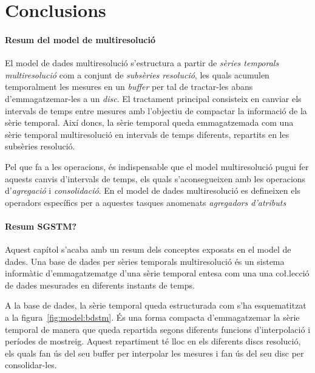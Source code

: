 \chapter{Conclusions}





\subsubsection{Resum del model de multiresolució}
El model de dades multiresolució s'estructura a partir de \emph{sèries temporals multiresolució} com a conjunt de \emph{subsèries resolució}, les quals  acumulen temporalment les mesures en un \emph{buffer} per tal de tractar-les abans d'emmagatzemar-les  a un \emph{disc}. El tractament principal consisteix en canviar els intervals de temps entre mesures amb l'objectiu de compactar la informació de la sèrie temporal.
Així doncs, la sèrie temporal queda emmagatzemada com una sèrie temporal multiresolució en intervals de temps diferents, repartits en les subsèries resolució. 

Pel que fa a les operacions, és indispensable que el model multiresolució pugui fer aquests canvis d'intervals de temps, els quals s'aconsegueixen amb les operacions d'\emph{agregació} i \emph{consolidació}. En el model de dades multiresolució es defineixen els operadors específics per a aquestes tasques anomenats \emph{agregadors d'atributs}



\subsubsection{Resum SGSTM?}

Aquest capítol s'acaba amb un resum dels conceptes exposats en el
model de dades. Una base de dades per sèries temporals multiresolució
és un sistema informàtic d'emmagatzematge d'una sèrie temporal entesa
com una una co\l.lecció de dades mesurades en diferents instants de
temps.

A la base de dades, la sèrie temporal queda estructurada com s'ha esquematitzat a  la figura~\ref{fig:model:bdstm}. És una forma compacta d'emmagatzemar la sèrie temporal de manera que queda repartida segons diferents funcions d'interpolació i períodes de mostreig. Aquest repartiment té lloc en els diferents discs resolució, els quals fan ús del seu buffer per interpolar les mesures i fan ús del seu disc per consolidar-les. 

